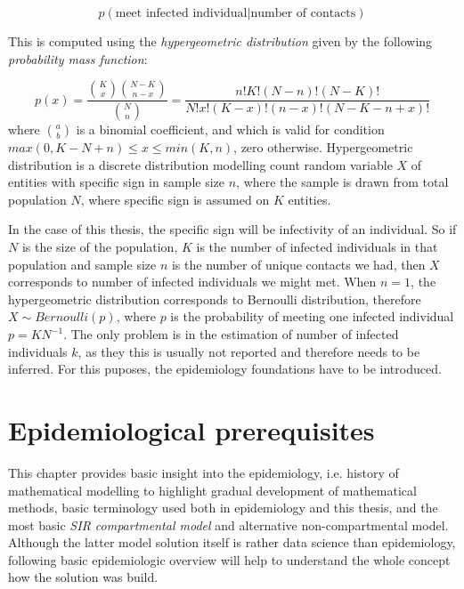 \documentclass[
  digital, %
  oneside, %
  lof,     %
  lot,     %
]{fithesis4}
\begin{document}
\begin{equation}
  p(\text{meet infected individual} | \text{number of contacts})
\end{equation}

This is computed using the \textit{hypergeometric distribution} 
given by  the following \textit{probability mass function}:

\begin{equation}
p \left( x \right) = 
\frac{
    \binom{K}{x}
    \binom{N-K}{n-x}
  }{
    \binom{N}{n}
  } =
  \frac{
    n!K! \left( N - n \right)!\left( N - K \right )!
  }{
    N! x! \left(K - x\right)! \left( n - x \right)! \left( N - K - n + x \right)!
  }
\end{equation}
where $\binom{a}{b}$ is a binomial coefficient, and which is valid for condition $max\left( 0, K - N + n \right) \leq x \leq min\left( K, n \right)$, zero otherwise. Hypergeometric distribution is a discrete distribution modelling count random variable $X$ of entities with specific sign in sample size $n$, where the sample is drawn from total population $N$, where specific sign is assumed on $K$ entities.

In the case of this thesis, the specific sign will be 
infectivity of an individual.
So if $N$ is the size of the population, $K$ is the 
number of infected individuals in that population and 
sample size $n$ is the number of unique contacts we 
had, then $X$ corresponds to number of infected 
individuals we might met. When $n = 1$, the 
hypergeometric distribution corresponds to Bernoulli 
distribution, therefore 
$X \sim Bernoulli \left( p \right)$, where $p$ is the 
probability of meeting one infected individual 
$p = K N^{-1}$. 
The only problem is in the estimation of number of 
infected individuals $k$, as they this is usually not 
reported and therefore needs to be inferred. 
For this puposes, the epidemiology foundations have 
to be introduced.


\chapter{Epidemiological prerequisites}

This chapter provides basic insight into the epidemiology, 
i.e. history of mathematical modelling to highlight gradual 
development of mathematical methods, basic terminology 
used both in epidemiology and this thesis, and the most 
basic \textit{SIR compartmental model} and alternative
non-compartmental model.
Although the latter model solution itself is rather data 
science than epidemiology, following basic epidemiologic 
overview will help to understand the whole concept how 
the solution was build.
\end{document}
